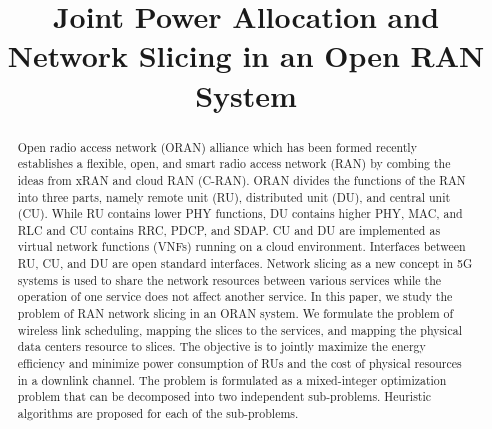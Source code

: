 \documentclass[conference]{IEEEtran}
\begin{document}
\title{Joint Power Allocation and Network Slicing in an Open RAN System \vspace{-.1cm}
}
%
  \author{
  }

\maketitle

\begin{abstract}
Open radio access network (ORAN) alliance which has been formed recently establishes a flexible,  open, and smart radio access network (RAN) by combing the ideas from xRAN and cloud RAN (C-RAN). ORAN divides the functions of the RAN into three parts, namely remote unit (RU), distributed unit (DU), and central unit (CU). While RU contains lower PHY functions, DU contains higher PHY, MAC, and RLC and CU contains RRC, PDCP, and SDAP. CU and DU are implemented as virtual network functions (VNFs) running on a cloud environment. Interfaces between RU, CU, and DU are open standard interfaces. Network slicing as a new concept in 5G systems is used to share the network resources between various services while the operation of one service does not affect another service. In this paper, we study the problem of RAN network slicing in an ORAN system.  We formulate the problem of wireless link scheduling, mapping the slices to the services, and mapping the physical data centers resource to slices. The objective is to jointly maximize the energy efficiency and minimize power consumption of RUs and the cost of physical resources in a downlink channel. The problem is formulated as a mixed-integer optimization problem that can be decomposed into two independent sub-problems. Heuristic algorithms are proposed for each of the sub-problems.
\end{abstract}
\end{document}
